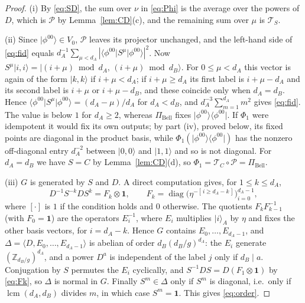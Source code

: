 \documentclass[11pt,a4paper]{article}
\theoremstyle{definition}
\theoremstyle{remark}
\newcommand{\ket}[1]{\lvert #1\rangle}
\newcommand{\bra}[1]{\langle #1\rvert}
\newcommand{\ketbra}[2]{\lvert #1\rangle\langle #2\rvert}
\newcommand{\dA}{d_A}
\newcommand{\dB}{d_B}
\newcommand{\PiB}{\Pi_{\mathrm{Bell}}}
\newcommand{\cP}{\mathcal{P}}
\newcommand{\cC}{\mathcal{T}_{C}}
\newcommand{\cS}{\mathcal{T}_{S}}
\newcommand{\id}{\mathbf{1}}
\newcommand{\phib}[2]{\phi^{#1#2}}
\DeclareMathOperator{\lcm}{lcm}
\begin{document}
\begin{proof}
(i) By \eqref{eq:SD}, the sum over $\nu$ in \eqref{eq:Phi} is the average over the powers
of $D$, which is $\cP$ by Lemma~\ref{lem:CD}(c), and the remaining sum over $\mu$ is
$\cS$.

(ii) Since $\ket{\phib00}\in V_0$, $\cP$ leaves its projector unchanged, and the left-hand
side of \eqref{eq:fid} equals $\dA^{-1}\sum_{\mu<\dA}|\bra{\phib00}S^{\mu}\ket{\phib00}|^{2}$.
Now $S^{\mu}\ket{i,i}=\ket{(i+\mu)\bmod\dA,\,(i+\mu)\bmod\dB}$. For $0\le\mu<\dA$ this vector
is again of the form $\ket{k,k}$ if $i+\mu<\dA$; if $i+\mu\ge\dA$ its first label is
$i+\mu-\dA$ and its second label is $i+\mu$ or $i+\mu-\dB$, and these coincide only when
$\dA=\dB$. Hence $\bra{\phib00}S^{\mu}\ket{\phib00}=(\dA-\mu)/\dA$ for $\dA<\dB$, and
$\dA^{-3}\sum_{m=1}^{\dA}m^{2}$ gives \eqref{eq:fid}. The value is below $1$ for
$\dA\ge2$, whereas $\PiB$ fixes $\ketbra{\phib00}{\phib00}$. If $\Phi_1$ were idempotent it
would fix its own outputs; by part (iv), proved below, its fixed points are diagonal in
the product basis, while $\Phi_1(\ketbra{\phib00}{\phib00})$ has the nonzero off-diagonal
entry $\dA^{-2}$ between $\ket{0,0}$ and $\ket{1,1}$ and so is not diagonal.
For $\dA=\dB$ we have $S=C$ by Lemma~\ref{lem:CD}(d), so $\Phi_1=\cC\circ\cP=\PiB$.

(iii) $G$ is generated by $S$ and $D$. A direct computation gives, for $1\le k\le\dA$,
\begin{equation}\label{eq:Fk}
D^{-1}S^{-k}DS^{k}=F_k\otimes\id,\qquad
F_k=\operatorname{diag}\bigl(\eta^{-[\,i\ge\dA-k\,]}\bigr)_{i=0}^{\dA-1},
\end{equation}
where $[\cdot]$ is $1$ if the condition holds and $0$ otherwise. The quotients
$F_kF_{k-1}^{-1}$ (with $F_0=\id$) are the operators $E_i^{-1}$, where $E_i$ multiplies
$\ket{i}_A$ by $\eta$ and fixes the other basis vectors, for $i=\dA-k$. Hence $G$ contains
$E_0,\dots,E_{\dA-1}$, and $\Delta=\langle D,E_0,\dots,E_{\dA-1}\rangle$ is abelian of order
$\dB(\dB/g)^{\dA}$: the $E_i$ generate $(\mathbb{Z}_{\dB/g})^{\dA}$, and a power $D^{a}$
is independent of the label $j$ only if $\dB\mid a$. Conjugation by $S$ permutes the
$E_i$ cyclically, and $S^{-1}DS=D(F_1\otimes\id)$ by \eqref{eq:Fk}, so $\Delta$ is normal
in $G$. Finally $S^{m}\in\Delta$ only if $S^{m}$ is diagonal, i.e.\ only if
$\lcm(\dA,\dB)$ divides $m$, in which case $S^m=\id$. This gives \eqref{eq:order}.


\end{proof}
\end{document}
